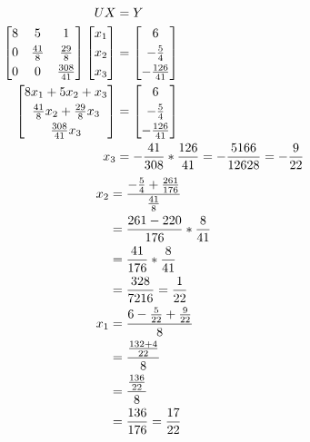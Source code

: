 	\begin{align}
		UX &= Y& \\
		\begin{bmatrix}
			8 & 5 & 1 \\[0.3em]
			0 & \frac{41}{8} & \frac{29}{8} \\[0.3em]
			0 & 0 & \frac{308}{41}
		\end{bmatrix}
		\begin{bmatrix}
			x_{1} \\[0.3em]
			x_{2} \\[0.3em]
			x_{3}
		\end{bmatrix} &= \begin{bmatrix}
				6 \\[0.3em]
				-\frac{5}{4} \\[0.3em]
				-\frac{126}{41}
			\end{bmatrix}& \notag \\
		\begin{bmatrix}
			8x_{1} + 5x_{2} + x_{3} \\[0.3em]
			\frac{41}{8}x_{2} + \frac{29}{8}x_{3} \\[0.3em]
			\frac{308}{41}x_{3}
		\end{bmatrix} &= \begin{bmatrix}
				6 \\[0.3em]
				-\frac{5}{4} \\[0.3em]
				-\frac{126}{41}
			\end{bmatrix}& \notag \\
		x_{3} &= -\frac{41}{308}*\frac{126}{41} = -\frac{5166}{12628} = -\frac{9}{22}&
	\end{align}
	\begin{align}
		x_{2} &= \frac{-\frac{5}{4} + \frac{261}{176}}{\frac{41}{8}}& \notag \\
		&= \frac{261-220}{176}*\frac{8}{41}& \notag \\
		&= \frac{41}{176}*\frac{8}{41}& \notag \\
		&= \frac{328}{7216} = \frac{1}{22}& \\
		x_{1} &= \frac{6 - \frac{5}{22} + \frac{9}{22}}{8}& \notag \\
		&= \frac{\frac{132+4}{22}}{8}& \notag \\
		&= \frac{\frac{136}{22}}{8}& \notag \\
		&= \frac{136}{176} = \frac{17}{22}& \notag \\
	\label{eq:51x}
	\end{align}	